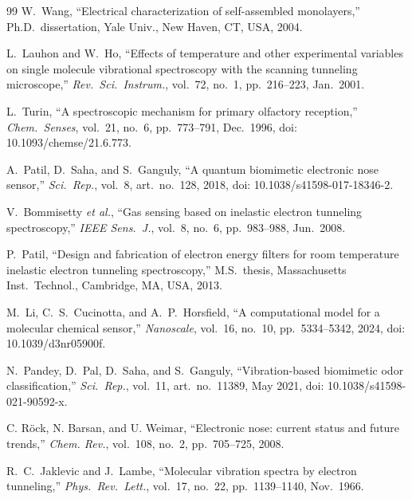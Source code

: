 \documentclass[conference]{IEEEtran}
\begin{document}
\begin{thebibliography}{99}
W.~Wang,
``Electrical characterization of self-assembled monolayers,''
Ph.D.\ dissertation, Yale Univ., New Haven, CT, USA, 2004.

L.~Lauhon and W.~Ho,
``Effects of temperature and other experimental variables on single molecule vibrational spectroscopy with the scanning tunneling microscope,''
\textit{Rev.\ Sci.\ Instrum.}, vol.~72, no.~1, pp.~216--223, Jan.\ 2001.

L.~Turin,
``A spectroscopic mechanism for primary olfactory reception,''
\textit{Chem.\ Senses}, vol.~21, no.~6, pp.~773--791, Dec.\ 1996, doi: 10.1093/chemse/21.6.773.


A.~Patil, D.~Saha, and S.~Ganguly,
``A quantum biomimetic electronic nose sensor,''
\textit{Sci.\ Rep.}, vol.~8, art.\ no.~128, 2018, doi: 10.1038/s41598-017-18346-2.



V.~Bommisetty \textit{et al.},
``Gas sensing based on inelastic electron tunneling spectroscopy,''
\textit{IEEE Sens.\ J.}, vol.~8, no.~6, pp.~983--988, Jun.\ 2008.

P.~Patil,
``Design and fabrication of electron energy filters for room temperature inelastic electron tunneling spectroscopy,''
M.S.\ thesis, Massachusetts Inst.\ Technol., Cambridge, MA, USA, 2013.

M.~Li, C.~S.~Cucinotta, and A.~P.~Horsfield,
``A computational model for a molecular chemical sensor,''
\textit{Nanoscale}, vol.~16, no.~10, pp.~5334--5342, 2024, doi: 10.1039/d3nr05900f.

N.~Pandey, D.~Pal, D.~Saha, and S.~Ganguly,
``Vibration-based biomimetic odor classification,''
\textit{Sci.\ Rep.}, vol.~11, art.\ no.~11389, May 2021, doi: 10.1038/s41598-021-90592-x.

C. R\"ock, N. Barsan, and U. Weimar, ``Electronic nose: current status and future trends,'' \emph{Chem. Rev.}, vol.\ 108, no.\ 2, pp.\ 705--725, 2008.

R.~C.~Jaklevic and J.~Lambe,
``Molecular vibration spectra by electron tunneling,''
\textit{Phys.\ Rev.\ Lett.}, vol.~17, no.~22, pp.~1139--1140, Nov.\ 1966.


\end{thebibliography}
\end{document}
